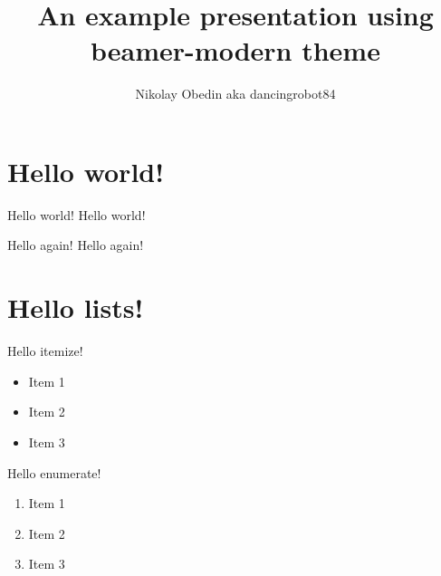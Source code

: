 \documentclass[xetex]{beamer}
\title[Hello world!]
    {An example presentation using beamer-modern theme}
\author
    {Nikolay Obedin aka dancingrobot84}
\begin{document}
    \frame{\titlepage}

    \frame{\tableofcontents}

    \section{Hello world!}

    \begin{frame}{Hello world!}
        Hello world!
    \end{frame}

    \begin{frame}{Hello again!}
        Hello again!
    \end{frame}

    \section{Hello lists!}

    \begin{frame}{Hello itemize!}
        \begin{itemize}
            \item Item 1
            \item Item 2
            \item Item 3
        \end{itemize}
    \end{frame}

    \begin{frame}{Hello enumerate!}
        \begin{enumerate}
            \item Item 1
            \item Item 2
            \item Item 3
        \end{enumerate}
    \end{frame}
\end{document}
